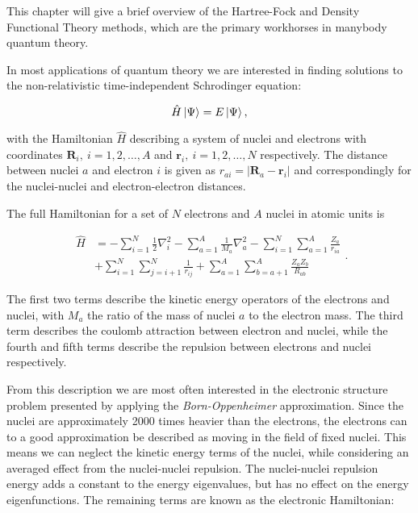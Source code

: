 This chapter will give a brief overview of the Hartree-Fock
and Density Functional Theory methods, which are the primary workhorses
in manybody quantum theory.
\par
In most applications of quantum theory we are interested in
finding solutions to the non-relativistic time-independent
Schrodinger equation:

$$ \hat{H} \ket{\Psi} = E \ket{\Psi} ,$$

with the Hamiltonian $\hat{H}$ describing a system of nuclei and electrons
with coordinates $\bm{R}_i, \ i=1,2,\dots,A$ and $\bm{r}_i, \
i=1,2,\dots,N$ respectively. The distance between nuclei $a$
and electron $i$ is given as $r_{ai} = \left| \bm{R}_a - \bm{r}_i \right|$
and correspondingly for the nuclei-nuclei and electron-electron distances.
\par
The full Hamiltonian for a set of $N$ electrons and $A$ nuclei
in atomic units is

\begin{equation}
    \begin{split}
        \hat{H} 
        &= -\sum_{i=1}^N \frac{1}{2} \nabla_i^2
        -\sum_{a=1}^A \frac{1}{M_a} \nabla_a^2
        -\sum_{i=1}^N \sum_{a=1}^A \frac{Z_a}{r_{ia}} \\
        &+ \sum_{i=1}^N \sum_{j=i+1}^N \frac{1}{r_{ij}}
        + \sum_{a=1}^A \sum_{b=a+1}^A \frac{Z_a Z_b}{R_{ab}}
    \end{split} .
\end{equation}

The first two terms describe the kinetic energy operators
of the electrons and nuclei, with $M_a$ the ratio of the mass
of nuclei $a$ to the electron mass. The third term describes the
coulomb attraction between electron and nuclei, while the fourth and fifth
terms describe the repulsion between electrons and nuclei respectively.
\par
From this description we are most often interested in the electronic
structure problem presented by applying the \textit{Born-Oppenheimer}
approximation. Since the nuclei are approximately 2000 times heavier
than the electrons, the electrons can to a good approximation
be described as moving in the field of fixed nuclei. This means we
can neglect the kinetic energy terms of the nuclei, while considering
an averaged effect from the nuclei-nuclei repulsion.
The nuclei-nuclei repulsion energy adds a constant to the energy
eigenvalues, but has no effect on the energy eigenfunctions.
The remaining terms are known as the electronic Hamiltonian:

